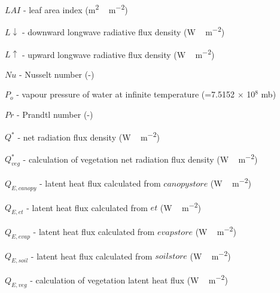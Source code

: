{\begin{description}
\item $LAI$  -  leaf area index (\unit{m^{2}\,m^{-2}}) 
\item $L\downarrow$  -   downward longwave radiative flux density (\unit{W\,m^{-2}})
\item $L\uparrow$  -  upward longwave radiative flux density (\unit{W\,m^{-2}}) 
\item $Nu$  -  Nusselt number (-) 
\item $P_{o}$  -  vapour pressure of water at infinite temperature (=7.5152 $\times$ 10$^8$ mb) 
\item $Pr$  -  Prandtl number (-) 
\item $Q^{*}$  -   net radiation flux density (\unit{W\,m^{-2}}) 
\item $Q^{*}_{veg}$  -   calculation of vegetation net radiation flux density (\unit{W\,m^{-2}})
\item $Q_{E,canopy}$  -   latent heat flux calculated from $canopystore$ (\unit{W\,m^{-2}}) 
\item $Q_{E,et}$  -  latent heat flux calculated from $et$ (\unit{W\,m^{-2}}) 
\item $Q_{E,evap}$  -   latent heat flux calculated from $evapstore$ (\unit{W\,m^{-2}}) 
\item $Q_{E,soil}$  -   latent heat flux calculated from $soilstore$ (\unit{W\,m^{-2}}) 
\item $Q_{E,veg}$  -   calculation of vegetation latent heat flux (\unit{W\,m^{-2}}) 

\end{description}}
